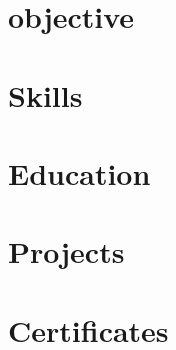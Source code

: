 \documentclass[a4paper,10pt]{article}
\begin{document}
% 

\section{objective}


\section{Skills}


\section{Education}


\section{Projects}





\section{Certificates}

\end{document}
